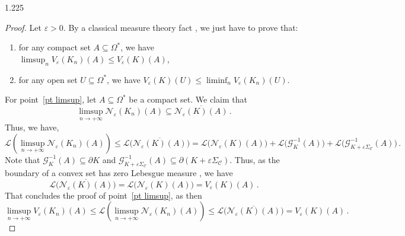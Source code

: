 \documentclass[reqno, a4paper]{amsart}
\numberwithin{equation}{section}
\numberwithin{figure}{section}
\theoremstyle{definition}
\theoremstyle{remark}
\newcommand{\C}{\mathcal{C}} %
\renewcommand{\S}{\Sigma_\C} %
\newcommand{\G}{\mathcal{G}} %
\newcommand{\vp}[1]{{\left( {#1} \right)}} %
\newcommand{\bp}[1]{{\bigl( {#1} \bigr)}} %
\begin{document}
\begin{spacing}{1.225}
\begin{proof}
Let $\varepsilon>0$. By a classical measure theory fact \cite[Theorem~1.40]{Evans_Gariepy_15}, we just have to prove that:
\begin{enumerate}[label=(\arabic*)]
 \item \label{pt limsup} for any compact set $A\subseteq \Omega^*$, we have $\limsup_{n} V_\varepsilon(K_n)(A) \leq V_\varepsilon(K)(A)$,
 \item \label{pt liminf} for any open set $U\subseteq \Omega^*$, we have $V_\varepsilon(K)(U) \leq \liminf_{n} V_\varepsilon(K_n)(U)$. 
\end{enumerate}

For point~\ref{pt limsup}, let $A\subseteq \Omega^*$ be a compact set. We claim that 
\begin{equation}
\label{claim1}
 \limsup_{n \to +\infty} \mathcal{N}_\varepsilon(K_n)(A) \subseteq \overline{\mathcal{N}_\varepsilon(K)(A)} \, . 
\end{equation}
Thus, we have,
\begin{equation*}
\mathcal{L}\vp{\limsup_{n\to+\infty} \mathcal{N}_\varepsilon(K_n)(A)} \leq \mathcal{L}\bp{\overline{\mathcal{N}_\varepsilon(K)(A)}} = \mathcal{L}\bp{\mathcal{N}_\varepsilon(K)(A)} + \mathcal{L}\bp{\G^{-1}_K(A)}+ \mathcal{L}\bp{\G^{-1}_{K + \varepsilon \S}(A)} \, . 
\end{equation*}
Note that $\G^{-1}_K(A) \subseteq \partial K$ and $\G^{-1}_{K + \varepsilon \S}(A) \subseteq \partial (K+ \varepsilon \S)$. Thus, as the boundary of a convex set has zero Lebesgue measure \cite[Theorem~1]{Lang_86}, we have 
\begin{equation*}
\mathcal{L}\bp{\overline{\mathcal{N}_\varepsilon(K)(A)}} = \mathcal{L}\bp{\mathcal{N}_\varepsilon(K)(A)} = V_\varepsilon(K)(A) \, .
\end{equation*}
That concludes the proof of point~\ref{pt limsup}, as then
\begin{equation*}
 \limsup_{n\to+\infty} V_\varepsilon(K_n)(A) \leq \mathcal{L}\vp{\limsup_{n\to+\infty} \mathcal{N}_\varepsilon(K_n)(A)} \leq \mathcal{L}\bp{\overline{\mathcal{N}_\varepsilon(K)(A)}} = V_\varepsilon(K)(A) \, . 
\end{equation*}


\end{proof}
\end{spacing}
\end{document}

